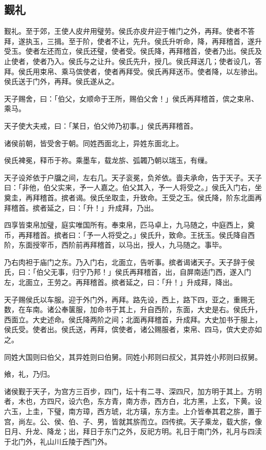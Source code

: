 \documentclass[]{article}
\begin{document}
\hypertarget{header-n48}{%
\subsection{觐礼}\label{header-n48}}

觐礼。至于郊，王使人皮弁用璧劳。侯氏亦皮弁迎于帷门之外，再拜。使者不答拜，遂执玉，三揖。至于阶，使者不让，先升。侯氏升听命，降，再拜稽首，遂升受玉。使者左还而立，侯氏还璧，使者受。侯氏降，再拜稽首，使者乃出。侯氏及止使者，使者乃入。侯氏与之让升。侯氏先升，授几。侯氏拜送几；使者设几，答拜。侯氏用束帛、乘马傧使者，使者再拜受。侯氏再拜送币。使者降，以左骖出。侯氏送于门外，再拜。侯氏遂从之。

天子赐舍，曰：「伯父，女顺命于王所，赐伯父舍！」侯氏再拜稽首，傧之束帛、乘马。

天子使大夫戒，曰：「某日，伯父帅乃初事。」侯氏再拜稽首。

诸侯前朝，皆受舍于朝。同姓西面北上，异姓东面北上。

侯氏裨冕，释币于祢。乘墨车，载龙旂、弧韣乃朝以瑞玉，有缫。

天子设斧依于户牖之间，左右几。天子衮冕，负斧依。啬夫承命，告于天子。天子曰：「非他，伯父实来，予一人嘉之。伯父其入，予一人将受之。」侯氏入门右，坐奠圭，再拜稽首。摈者谒。侯氏坐取圭，升致命。王受之玉。侯氏降，阶东北面再拜稽首。摈者延之，曰：「升！」升成拜，乃出。

四享皆束帛加璧，庭实唯国所有。奉束帛，匹马卓上，九马随之，中庭西上，奠币，再拜稽首。摈者曰：「予一人将受之。」侯氏升，致命。王抚玉。侯氏降自西阶，东面授宰币，西阶前再拜稽首，以马出，授人，九马随之。事毕。

乃右肉袒于庙门之东。乃入门右，北面立，告听事。摈者谒诸天子。天子辞于侯氏，曰：「伯父无事，归宁乃邦！」侯氏再拜稽首，出，自屏南适门西，遂入门左，北面立，王劳之。再拜稽首。摈者延之，曰：「升！」升成拜，降出。

天子赐侯氏以车服。迎于外门外，再拜。路先设，西上，路下四，亚之，重赐无数，在车南。诸公奉箧服，加命书于其上，升自西阶，东面，大史是右。侯氏升，西面立。大史述命。侯氏降两阶之间；北面再拜稽首，升成拜。大史加书于服上，侯氏受。使者出。侯氏送，再拜，傧使者，诸公赐服者，束帛、四马，傧大史亦如之。

同姓大国则曰伯父，其异姓则曰伯舅。同姓小邦则曰叔父，其异姓小邦则曰叔舅。

飨，礼，乃归。

诸侯觐于天子，为宫方三百步，四门，坛十有二寻、深四尺，加方明于其上。方明者，木也，方四尺，设六色，东方青，南方赤，西方白，北方黑，上玄，下黄。设六玉，上圭，下璧，南方璋，西方琥，北方璜，东方圭。上介皆奉其君之旂，置于宫，尚左。公、侯、伯、子、男，皆就其旂而立。四传摈。天子乘龙，载大旂，像日月、升龙、降龙；出，拜日于东门之外，反祀方明。礼日于南门外，礼月与四渎于北门外，礼山川丘陵于西门外。
\end{document}
